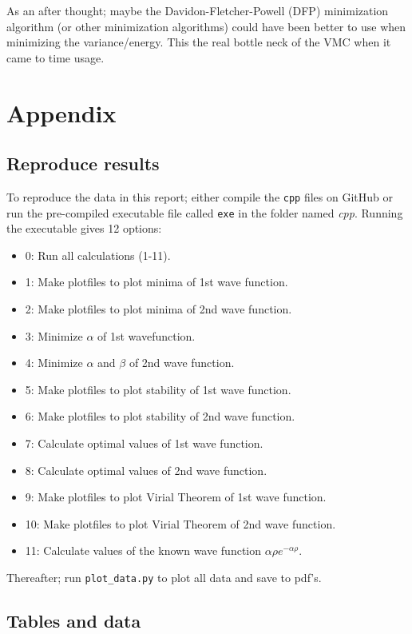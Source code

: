 \documentclass[12pt,english,a4paper]{article}
\begin{document}
As an after thought; maybe the Davidon-Fletcher-Powell (DFP) minimization algorithm (or other minimization algorithms) could have been better to use when minimizing the variance/energy. This the real bottle neck of the VMC when it came to time usage.

\section{Appendix} \label{section:appendix}
\subsection{Reproduce results} \label{section:appendix:reproduce}
To reproduce the data in this report; either compile the \texttt{cpp} files on GitHub or run the pre-compiled executable file called \texttt{exe} in the folder named \textit{cpp}. Running the executable gives 12 options:

\begin{itemize}
    \renewcommand\labelitemi{--}
    \item 0: Run all calculations (1-11).
    \item 1: Make plotfiles to plot minima of 1st wave function.
    \item 2: Make plotfiles to plot minima of 2nd wave function.
    \item 3: Minimize $\alpha$ of 1st wavefunction.
    \item 4: Minimize $\alpha$ and $\beta$ of 2nd wave function.
    \item 5: Make plotfiles to plot stability of 1st wave function.
    \item 6: Make plotfiles to plot stability of 2nd wave function.
    \item 7: Calculate optimal values of 1st wave function.
    \item 8: Calculate optimal values of 2nd wave function.
    \item 9: Make plotfiles to plot Virial Theorem of 1st wave function.
    \item 10: Make plotfiles to plot Virial Theorem of 2nd wave function.
    \item 11: Calculate values of the known wave function $\alpha\rho e^{-\alpha\rho}$.
\end{itemize}

Thereafter; run \texttt{plot\_data.py} to plot all data and save to pdf's.

\subsection{Tables and data} \label{section:appendix:tables}
\end{document}
